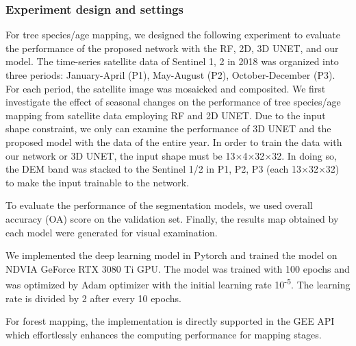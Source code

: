\subsubsection*{Experiment design and settings}
For tree species/age mapping, we designed the following experiment to evaluate the performance of the proposed network with the RF, 2D, 3D UNET, and our model. The time-series satellite data of Sentinel 1, 2 in 2018 was organized into three periods: January-April (P1), May-August (P2), October-December (P3). For each period, the satellite image was mosaicked and composited. We first investigate the effect of seasonal changes on the performance of tree species/age mapping from satellite data employing RF and 2D UNET. Due to the input shape constraint, we only can examine the performance of 3D UNET and the proposed model with the data of the entire year.  In order to train the data with our network or 3D UNET, the input shape must be 13$\times$4$\times$32$\times$32. In doing so, the DEM band was stacked to the Sentinel 1/2 in P1, P2, P3 (each 13$\times$32$\times$32) to make the input trainable to the network. \par
To evaluate the performance of the segmentation models, we used overall accuracy (OA) score on the validation set. Finally, the results map obtained by each model were generated for visual examination. \par
We implemented the deep learning model in Pytorch and trained the model on NDVIA GeForce RTX 3080 Ti GPU. The model was trained with 100 epochs and was optimized by Adam optimizer with the initial learning rate 10\textsuperscript{-5}. The learning rate is divided by 2 after every 10 epochs.\par
For forest mapping, the implementation is directly supported in the GEE API which effortlessly enhances the computing performance for mapping stages. \par

